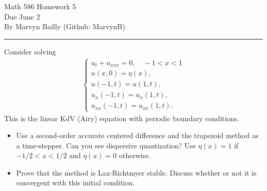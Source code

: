 \documentclass[12pt]{report}
\begin{document}
\large

\begin{center}
 Math 586 Homework 5\\
 Due June 2\\
 By Marvyn Bailly (Github: MarvynB)\\
\end{center}

\normalsize

\hrule




\begin{problem}
    Consider solving
    \begin{align*}
        \begin{cases} u_t + u_{xxx} = 0, \quad -1 < x < 1\\
            u(x,0) = \eta(x),\\
            u(-1,t) = u(1,t),\\
      u_x(-1,t) = u_x(1,t),\\
      u_{xx}(-1,t) = u_{xx}(1,t).\end{cases}
    \end{align*}
    This is the linear KdV (Airy) equation with periodic boundary conditions.
    \begin{itemize}
        \item Use a second-order accurate centered difference and the trapezoid method as a time-stepper. Can you see dispersive quantization? Use $\eta(x) = 1$ if $-1/2 < x < 1/2$ and $\eta(x) =0$ otherwise.
        \item Prove that the method is Lax-Richtmyer stable.  Discuss whether or not it is convergent with this initial condition.
    \end{itemize}
\end{problem}
\end{document}
